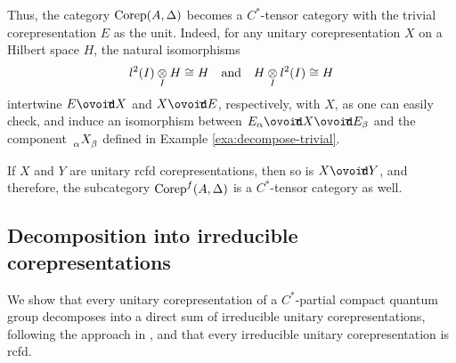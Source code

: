 Thus, the category $\mathrm{Corep}(A,\Delta)$ becomes a $C^{*}$-tensor category with the trivial corepresentation $E$ as the unit. 
Indeed, for any unitary corepresentation $X$ on a Hilbert space $H$, the natural isomorphisms
\begin{align*}
  l^{2}(I) \underset{I}{\otimes} H \cong H  \quad \text{and} \quad H \underset{I}{\otimes} l^{2}(I)\cong H
\end{align*}
intertwine $E \Circt X$ and $X\Circt E$, respectively, with $X$, as one can easily check, and induce an  isomorphism between  $ E_{\alpha} \Circt X \Circt E_{\beta}$ and the  component  $\Grd{X}{\alpha}{\beta}$  defined in Example \ref{exa:decompose-trivial}.



If $X$ and $Y$ are unitary rcfd corepresentations, then so is $X\Circt Y$, and therefore,  the subcategory
$\mathrm{Corep}^{f}(A,\Delta)$ is a $C^{*}$-tensor category as well.


\subsection{Decomposition into irreducible corepresentations}

We show that  every unitary
corepresentation of a $C^{*}$-partial compact quantum group decomposes into a direct sum of irreducible unitary corepresentations, following
the approach in \cite{MVD1}, and that every irreducible unitary corepresentation is rcfd.

